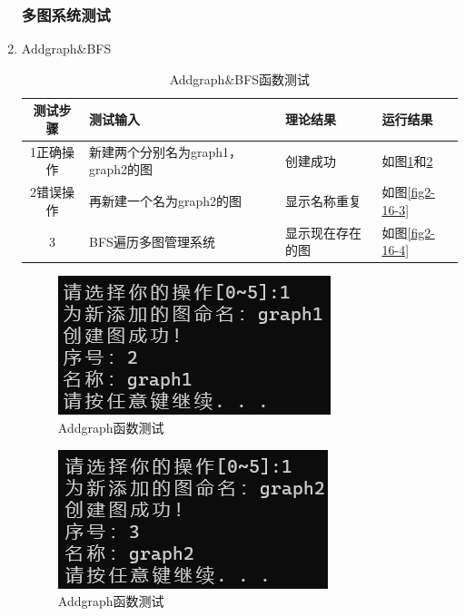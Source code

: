 \documentclass[supercite]{Experimental_Report}
\theoremstyle{definition}
\begin{document}
\begin{enumerate}
	\subsubsection{多图系统测试}
	\item Addgraph\&BFS
	\begin{table}[h!]
		\begin{center}
			\caption{Addgraph\&BFS函数测试}
			\begin{tabular}{|c|p{4cm}<{\centering}|p{4cm}<{\centering}|p{4cm}<{\centering}|} 
				\hline
				\textbf{测试步骤} & \textbf{测试输入} & \textbf{理论结果} & \textbf{运行结果} \\
				\hline
				1正确操作 & 新建两个分别名为graph1，graph2的图 &创建成功 &如图\ref{fig2-16-1}和\ref{fig2-16-2}\\
				\hline
				2错误操作 & 再新建一个名为graph2的图 &显示名称重复 &如图\ref{fig2-16-3}\\
				\hline
				3 & BFS遍历多图管理系统 &显示现在存在的图 &如图\ref{fig2-16-4}\\
				\hline
			\end{tabular}
		\end{center}
	\end{table}
	\begin{figure}[H] %
		\begin{center}
			\includegraphics[width=0.5\linewidth]{images/graph/18-1-1.png}
			\caption{ Addgraph函数测试}
			\label{fig2-16-1}
		\end{center}
	\end{figure}
	\begin{figure}[H] %
		\begin{center}
			\includegraphics[width=0.5\linewidth]{images/graph/18-1-2.png}
			\caption{ Addgraph函数测试}
			\label{fig2-16-2}
		\end{center}

\end{figure}
\end{enumerate}
\end{document}
